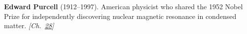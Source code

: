 \nobelphysics \textbf{Edward Purcell} (1912–1997). American physicist who shared the 1952 Nobel Prize for independently discovering nuclear magnetic resonance in condensed matter. \emph{[Ch.~\hyperref[ch:negativetemperature]{28}]}

